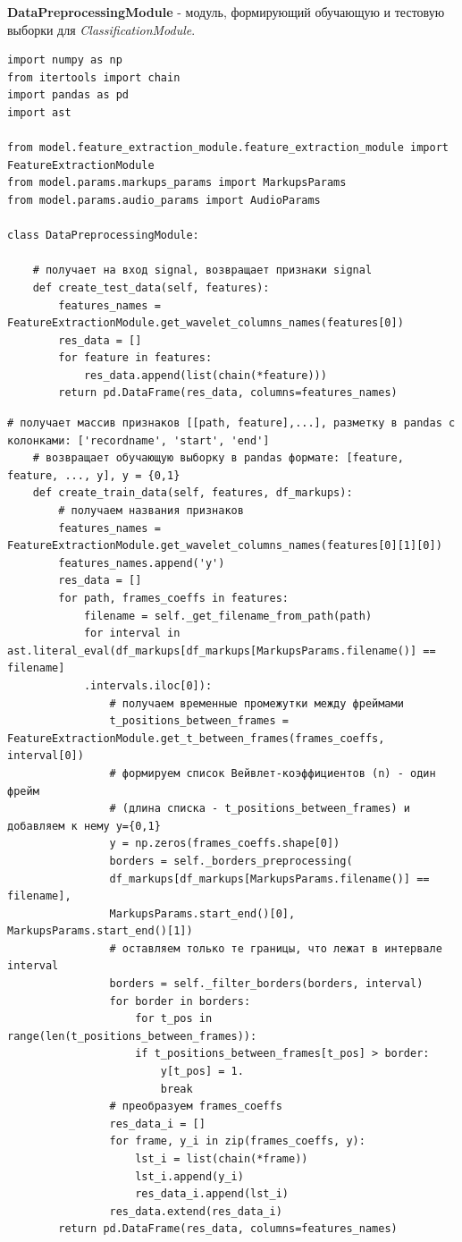 \documentclass[utf8x, 14pt, oneside, a4paper]{article}
\begin{document}
	{\bf DataPreprocessingModule} - модуль, формирующий обучающую и тестовую выборки для \textit{ClassificationModule}.
	\begin{lstlisting}[caption=DataPreprocessingModule]
import numpy as np
from itertools import chain
import pandas as pd
import ast

from model.feature_extraction_module.feature_extraction_module import FeatureExtractionModule
from model.params.markups_params import MarkupsParams
from model.params.audio_params import AudioParams

class DataPreprocessingModule:

	# получает на вход signal, возвращает признаки signal
	def create_test_data(self, features):
		features_names = FeatureExtractionModule.get_wavelet_columns_names(features[0])
		res_data = []
		for feature in features:
			res_data.append(list(chain(*feature)))
		return pd.DataFrame(res_data, columns=features_names)
	\end{lstlisting}
	\begin{lstlisting}[caption=DataPreprocessingModule Продолжение]
	# получает массив признаков [[path, feature],...], разметку в pandas с колонками: ['recordname', 'start', 'end']
	# возвращает обучающую выборку в pandas формате: [feature, feature, ..., y], y = {0,1}
	def create_train_data(self, features, df_markups):
		# получаем названия признаков
		features_names = FeatureExtractionModule.get_wavelet_columns_names(features[0][1][0])
		features_names.append('y')
		res_data = []
		for path, frames_coeffs in features:
			filename = self._get_filename_from_path(path)
			for interval in ast.literal_eval(df_markups[df_markups[MarkupsParams.filename()] == filename]
			.intervals.iloc[0]):
				# получаем временные промежутки между фреймами
				t_positions_between_frames = FeatureExtractionModule.get_t_between_frames(frames_coeffs, interval[0])
				# формируем список Вейвлет-коэффициентов (n) - один фрейм
				# (длина списка - t_positions_between_frames) и добавляем к нему y={0,1}
				y = np.zeros(frames_coeffs.shape[0])
				borders = self._borders_preprocessing(
				df_markups[df_markups[MarkupsParams.filename()] == filename],
				MarkupsParams.start_end()[0], MarkupsParams.start_end()[1])
				# оставляем только те границы, что лежат в интервале interval
				borders = self._filter_borders(borders, interval)
				for border in borders:
					for t_pos in range(len(t_positions_between_frames)):
					if t_positions_between_frames[t_pos] > border:
						y[t_pos] = 1.
						break
				# преобразуем frames_coeffs
				res_data_i = []
				for frame, y_i in zip(frames_coeffs, y):
					lst_i = list(chain(*frame))
					lst_i.append(y_i)
					res_data_i.append(lst_i)
				res_data.extend(res_data_i)
		return pd.DataFrame(res_data, columns=features_names)
	\end{lstlisting}
\end{document}
